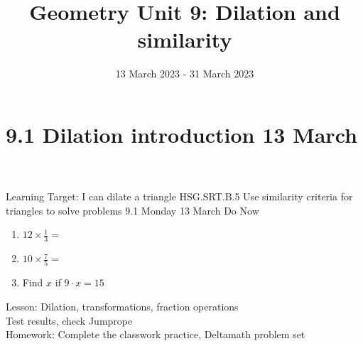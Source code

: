 \documentclass[onlytextwidth, aspectratio=169]{beamer}
\title{Geometry Unit 9: Dilation and similarity}
\date{13 March 2023 - 31 March 2023}
\begin{document}
\frame{\titlepage}
\section[Outline]{}
\frame{\tableofcontents}

\section{9.1 Dilation introduction \hfill 13 March \,}
\begin{frame}{Learning Target: I can dilate a triangle}
  {HSG.SRT.B.5 Use similarity criteria for triangles to solve problems \hfill \alert{9.1 Monday 13 March}}
    Do Now
    \begin{enumerate}
      \item $12 \times \frac{1}{3}=$
      \item $10 \times \frac{7}{5}=$
      \item Find $x$ if $9 \cdot x = 15$
    \end{enumerate}
    Lesson: Dilation, transformations, fraction operations \\
    Test results, check Jumprope\\[0.5cm]
    Homework: Complete the classwork practice, Deltamath problem set
\end{frame}
\end{document}
